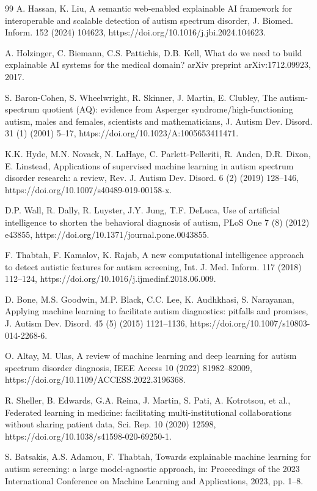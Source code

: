 \documentclass[pdflatex,sn-vancouver-num]{sn-jnl}
\begin{document}
\begin{thebibliography}{99}
A. Hassan, K. Liu, A semantic web-enabled explainable AI framework for interoperable and scalable detection of autism spectrum disorder, J. Biomed. Inform. 152 (2024) 104623, https://doi.org/10.1016/j.jbi.2024.104623.

A. Holzinger, C. Biemann, C.S. Pattichis, D.B. Kell, What do we need to build explainable AI systems for the medical domain? arXiv preprint arXiv:1712.09923, 2017.

S. Baron-Cohen, S. Wheelwright, R. Skinner, J. Martin, E. Clubley, The autism-spectrum quotient (AQ): evidence from Asperger syndrome/high-functioning autism, males and females, scientists and mathematicians, J. Autism Dev. Disord. 31 (1) (2001) 5--17, https://doi.org/10.1023/A:1005653411471.

K.K. Hyde, M.N. Novack, N. LaHaye, C. Parlett-Pelleriti, R. Anden, D.R. Dixon, E. Linstead, Applications of supervised machine learning in autism spectrum disorder research: a review, Rev. J. Autism Dev. Disord. 6 (2) (2019) 128--146, https://doi.org/10.1007/s40489-019-00158-x.

D.P. Wall, R. Dally, R. Luyster, J.Y. Jung, T.F. DeLuca, Use of artificial intelligence to shorten the behavioral diagnosis of autism, PLoS One 7 (8) (2012) e43855, https://doi.org/10.1371/journal.pone.0043855.

F. Thabtah, F. Kamalov, K. Rajab, A new computational intelligence approach to detect autistic features for autism screening, Int. J. Med. Inform. 117 (2018) 112--124, https://doi.org/10.1016/j.ijmedinf.2018.06.009.

D. Bone, M.S. Goodwin, M.P. Black, C.C. Lee, K. Audhkhasi, S. Narayanan, Applying machine learning to facilitate autism diagnostics: pitfalls and promises, J. Autism Dev. Disord. 45 (5) (2015) 1121--1136, https://doi.org/10.1007/s10803-014-2268-6.

O. Altay, M. Ulas, A review of machine learning and deep learning for autism spectrum disorder diagnosis, IEEE Access 10 (2022) 81982--82009, https://doi.org/10.1109/ACCESS.2022.3196368.

R. Sheller, B. Edwards, G.A. Reina, J. Martin, S. Pati, A. Kotrotsou, et al., Federated learning in medicine: facilitating multi-institutional collaborations without sharing patient data, Sci. Rep. 10 (2020) 12598, https://doi.org/10.1038/s41598-020-69250-1.

S. Batsakis, A.S. Adamou, F. Thabtah, Towards explainable machine learning for autism screening: a large model-agnostic approach, in: Proceedings of the 2023 International Conference on Machine Learning and Applications, 2023, pp. 1--8.


\end{thebibliography}
\end{document}
